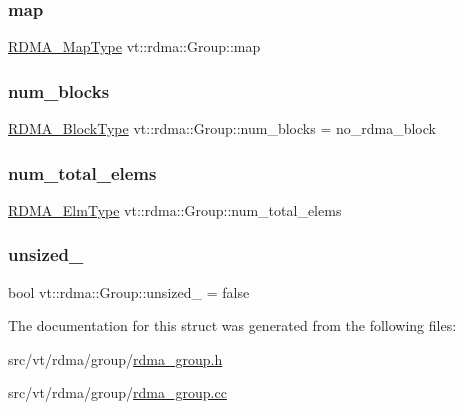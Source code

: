 \mbox{\label{structvt_1_1rdma_1_1_group_ab2d2df3f8a32c3230210ab7ce74c0e4e}} 
\subsubsection{\texorpdfstring{map}{map}}
{\footnotesize\ttfamily \hyperlink{structvt_1_1rdma_1_1_group_a6a953be1b6d9907d49364a9a202d3379}{R\+D\+M\+A\+\_\+\+Map\+Type} vt\+::rdma\+::\+Group\+::map}

\mbox{\label{structvt_1_1rdma_1_1_group_aa796cf358db135c28675c3843d839e4b}} 
\subsubsection{\texorpdfstring{num\+\_\+blocks}{num\_blocks}}
{\footnotesize\ttfamily \hyperlink{namespacevt_ae54d2ca8f6bb4d65faf65118c82cd6f7}{R\+D\+M\+A\+\_\+\+Block\+Type} vt\+::rdma\+::\+Group\+::num\+\_\+blocks = no\+\_\+rdma\+\_\+block}

\mbox{\label{structvt_1_1rdma_1_1_group_ad2de94667177ad994c5b5b7b697d09ac}} 
\subsubsection{\texorpdfstring{num\+\_\+total\+\_\+elems}{num\_total\_elems}}
{\footnotesize\ttfamily \hyperlink{namespacevt_a2c2a902092b72056f70210c159f966f0}{R\+D\+M\+A\+\_\+\+Elm\+Type} vt\+::rdma\+::\+Group\+::num\+\_\+total\+\_\+elems}

\mbox{\label{structvt_1_1rdma_1_1_group_a670e96730f19cc80e7b55a391d96f0b4}} 
\subsubsection{\texorpdfstring{unsized\+\_\+}{unsized\_}}
{\footnotesize\ttfamily bool vt\+::rdma\+::\+Group\+::unsized\+\_\+ = false}



The documentation for this struct was generated from the following files\+:\begin{DoxyCompactItemize}
\item 
src/vt/rdma/group/\hyperlink{rdma__group_8h}{rdma\+\_\+group.\+h}\item 
src/vt/rdma/group/\hyperlink{rdma__group_8cc}{rdma\+\_\+group.\+cc}\end{DoxyCompactItemize}
